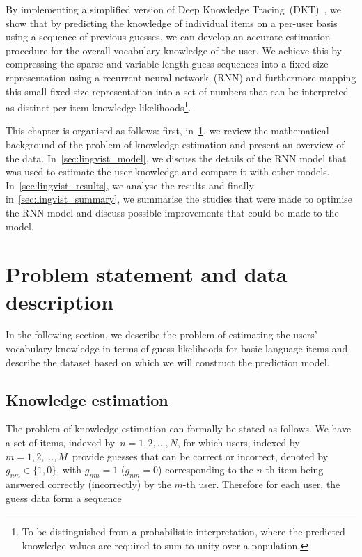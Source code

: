 By implementing a simplified version of Deep Knowledge Tracing~(DKT)~\cite{DBLP:journals/corr/PiechSHGSGS15}, we show that by predicting the knowledge of individual items on a per-user basis using a sequence of previous guesses, we can develop an accurate estimation procedure for the overall vocabulary knowledge of the user. We achieve this by compressing the sparse and variable-length guess sequences into a fixed-size representation using a recurrent neural network~(RNN) and furthermore mapping this small fixed-size representation into a set of numbers that can be interpreted as distinct per-item knowledge likelihoods\footnote{To be distinguished from a probabilistic interpretation, where the predicted knowledge values are required to sum to unity over a population.}.

This chapter is organised as follows: first, in~\cref{sec:lingvist_problem}, we review the mathematical background of the problem of knowledge estimation and present an overview of the data. In~\cref{sec:lingvist_model}, we discuss the details of the RNN model that was used to estimate the user knowledge and compare it with other models. In~\cref{sec:lingvist_results}, we analyse the results and finally in~\cref{sec:lingvist_summary}, we summarise the studies that were made to optimise the RNN model and discuss possible improvements that could be made to the model.

\section{Problem statement and data description}
\label{sec:lingvist_problem}
In the following section, we describe the problem of estimating the users' vocabulary knowledge in terms of guess likelihoods for basic language items and describe the dataset based on which we will construct the prediction model.

\subsection{Knowledge estimation}
The problem of knowledge estimation can formally be stated as follows. We have a set of items, indexed by~$n = {1, 2, \dots, N}$, for which users, indexed by~$m  = {1, 2, \dots, M}$~provide guesses that can be correct or incorrect, denoted by~$g_{nm}\in\{1, 0\}$, with $g_{nm} = 1$ ($g_{nm} = 0$) corresponding to the $n$-th item being answered correctly (incorrectly) by the $m$-th user. Therefore for each user, the guess data form a sequence

